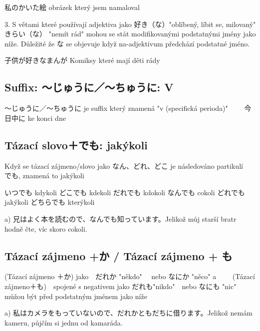 私のかいた絵 obrázek který jsem namaloval

3. S větami které používají adjektiva jako 好き（な）"oblíbený, líbit se, milovaný"　きらい（な） "nemít rád"  mohou se stát modifikovanými podstatnými jmény jako níže. Důležité že な se objevuje když na-adjektivum předchází podstatné jméno.

子供が好きなまんが Komiksy které mají děti rády



\subsection{Suffix: 〜じゅうに／〜ちゅうに: V}
〜じゅうに／〜ちゅうに je suffix který znamená "v (specifická perioda)"　　
今日中に ke konci dne

\subsection{Tázací slovo＋でも: jakýkoli}

Když se tázací zájmeno/slovo jako なん、どれ、どこ je následováno partikulí　でも, znamená to jakýkoli

いつでも kdykoli
どこでも kdekoli
だれでも kdokoli
なんでも cokoli
どれでも jakýkoli
どちらでも kterýkoli


a) 兄はよく本を読むので、なんでも知っています。Jelikož můj starší bratr hodně čte, víc skoro cokoli.

\subsection{Tázací zájmeno +か / Tázací zájmeno + も}
(Tázací zájmeno ＋か) jako　だれか "někdo"　 nebo なにか "něco" a 　　(Tázací zájmeno＋も)　spojené s negativem jako だれも"nikdo"　nebo なにも "nic" můžou být před podstatným jménem jako níže

a) 私はカメラをもっていないので、だれかともだちに借ります。Jelikož nemám kameru, půjčím si jednu od kamaráda.































